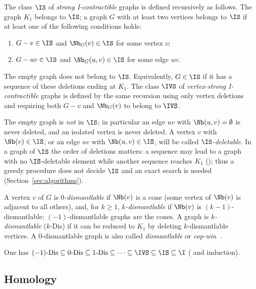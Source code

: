\begin{definition}\label{def:IS}
The class $\IS$ of \emph{strong I-contractible} graphs is defined recursively as follows. The graph $K_1$ belongs to $\IS$; a graph $G$ with at least two vertices belongs to $\IS$ if at least one of the following conditions holds:
\begin{enumerate}[label=(S\arabic*),leftmargin=3em]
\item $G-v\in\IS$ and $\Nb_G(v)\in\IS$ for some vertex $v$;
\item $G-uv\in\IS$ and $\Nb_G(u,v)\in\IS$ for some edge $uv$.
\end{enumerate}
The empty graph does not belong to $\IS$. Equivalently, $G\in\IS$ if it has a sequence of these deletions ending at $K_1$. The class $\IVS$ of \emph{vertex-strong I-contractible} graphs is defined by the same recursion using only vertex deletions and requiring both $G-v$ and $\Nb_G(v)$ to belong to $\IVS$.
\end{definition}

The empty graph is \emph{not} in $\IS$; in particular an edge $uv$ with $\Nb(u,v)=\emptyset$ is never deleted, and an isolated vertex is never deleted. A vertex $v$ with $\Nb(v)\in\IS$, or an edge $uv$ with $\Nb(u,v)\in\IS$, will be called \emph{$\IS$-deletable}. In a graph of $\IS$ the order of deletions matters: a sequence may lead to a graph with no $\IS$-deletable element while another sequence reaches $K_1$ (\cite[Fig.~2B]{DEFH2023}); thus a greedy procedure does not decide $\IS$ and an exact search is needed (Section~\ref{sec:algorithms}).

\begin{definition}\label{def:kdis}
A vertex $v$ of $G$ is \emph{$0$-dismantlable} if $\Nb(v)$ is a cone (some vertex of $\Nb(v)$ is adjacent to all others), and, for $k\ge 1$, \emph{$k$-dismantlable} if $\Nb(v)$ is $(k-1)$-dismantlable; $(-1)$-dismantlable graphs are the cones. A graph is \emph{$k$-dismantlable} ($k$-Dis) if it can be reduced to $K_1$ by deleting $k$-dismantlable vertices. A $0$-dismantlable graph is also called \emph{dismantlable} or \emph{cop-win}~\cite{NowakowskiWinkler1983}.
\end{definition}

One has $(-1)\text{-Dis}\subseteq 0\text{-Dis}\subseteq 1\text{-Dis}\subseteq\cdots\subseteq\IVS\subseteq\IS\subseteq\I$ (\cite[Lemma~19]{DEFH2023} and induction).

\subsection{Homology}

